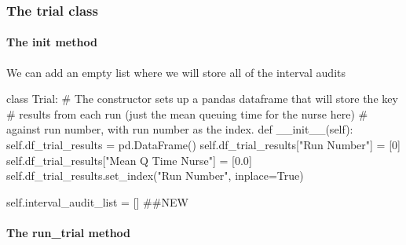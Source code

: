 \documentclass[
  letterpaper,
  DIV=11,
  numbers=noendperiod]{scrreprt}
\let\oldparagraph\paragraph
\renewcommand{\paragraph}[1]{\oldparagraph{#1}\mbox{}}
\newenvironment{Shaded}{\begin{snugshade}}{\end{snugshade}}
\newcommand{\CommentTok}[1]{\textcolor[rgb]{0.37,0.37,0.37}{#1}}
\newcommand{\DecValTok}[1]{\textcolor[rgb]{0.68,0.00,0.00}{#1}}
\newcommand{\FloatTok}[1]{\textcolor[rgb]{0.68,0.00,0.00}{#1}}
\newcommand{\FunctionTok}[1]{\textcolor[rgb]{0.28,0.35,0.67}{#1}}
\newcommand{\KeywordTok}[1]{\textcolor[rgb]{0.00,0.23,0.31}{#1}}
\newcommand{\NormalTok}[1]{\textcolor[rgb]{0.00,0.23,0.31}{#1}}
\newcommand{\OperatorTok}[1]{\textcolor[rgb]{0.37,0.37,0.37}{#1}}
\newcommand{\StringTok}[1]{\textcolor[rgb]{0.13,0.47,0.30}{#1}}
\newcommand{\VariableTok}[1]{\textcolor[rgb]{0.07,0.07,0.07}{#1}}
\begin{document}
\subsubsection{The trial class}\label{the-trial-class-8}

\paragraph{\texorpdfstring{The \textbf{init}
method}{The init method}}\label{the-init-method-9}

We can add an empty list where we will store all of the interval audits

\begin{Shaded}
\begin{Highlighting}[]
\KeywordTok{class}\NormalTok{ Trial:}
    \CommentTok{\# The constructor sets up a pandas dataframe that will store the key}
    \CommentTok{\# results from each run (just the mean queuing time for the nurse here)}
    \CommentTok{\# against run number, with run number as the index.}
    \KeywordTok{def}  \FunctionTok{\_\_init\_\_}\NormalTok{(}\VariableTok{self}\NormalTok{):}
        \VariableTok{self}\NormalTok{.df\_trial\_results }\OperatorTok{=}\NormalTok{ pd.DataFrame()}
        \VariableTok{self}\NormalTok{.df\_trial\_results[}\StringTok{"Run Number"}\NormalTok{] }\OperatorTok{=}\NormalTok{ [}\DecValTok{0}\NormalTok{]}
        \VariableTok{self}\NormalTok{.df\_trial\_results[}\StringTok{"Mean Q Time Nurse"}\NormalTok{] }\OperatorTok{=}\NormalTok{ [}\FloatTok{0.0}\NormalTok{]}
        \VariableTok{self}\NormalTok{.df\_trial\_results.set\_index(}\StringTok{"Run Number"}\NormalTok{, inplace}\OperatorTok{=}\VariableTok{True}\NormalTok{)}

        \VariableTok{self}\NormalTok{.interval\_audit\_list }\OperatorTok{=}\NormalTok{ [] }\CommentTok{\#\#NEW}
\end{Highlighting}
\end{Shaded}

\paragraph{The run\_trial method}\label{the-run_trial-method-4}
\end{document}
